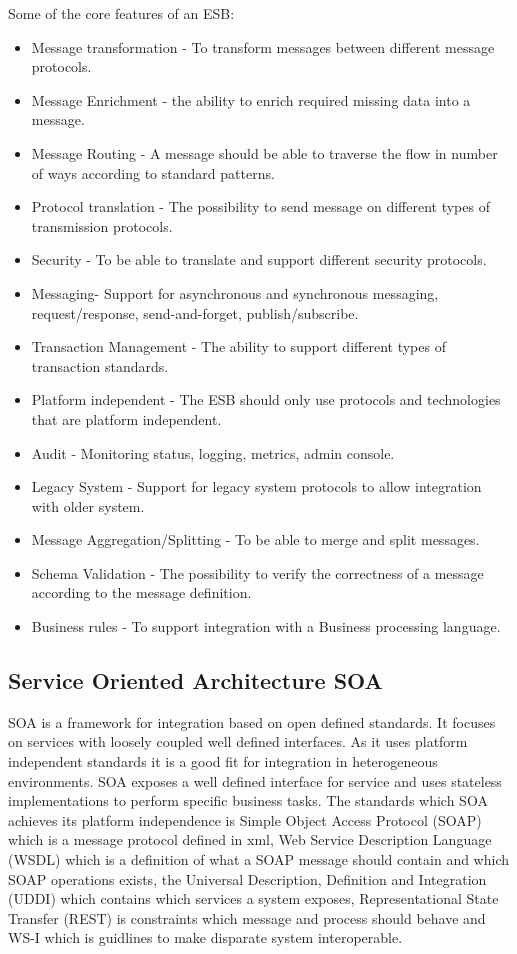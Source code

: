 \documentclass{llncs}
\begin{document}
Some of the core features of an ESB:
\begin{itemize}
\item Message transformation - To transform messages between different message protocols.
\item Message Enrichment - the ability to enrich required missing data into a message.
\item Message Routing - A message should be able to traverse the flow in number of ways according to standard patterns.
\item Protocol translation - The possibility to send message on different types of transmission protocols.
\item Security - To be able to translate and support different security protocols.
\item Messaging- Support for asynchronous and synchronous messaging, request/response, send-and-forget, publish/subscribe.
\item Transaction Management - The ability to support different types of transaction standards.
\item Platform independent - The ESB should only use protocols and technologies that are platform independent.
\item Audit - Monitoring status, logging, metrics, admin console.
\item Legacy System - Support for legacy system protocols to allow integration with older system.
\item Message Aggregation/Splitting - To be able to merge and split messages.
\item Schema Validation - The possibility to verify the correctness of a message according to the message definition.
\item Business rules - To support integration with a Business processing language.
\end{itemize}



\subsection{Service Oriented Architecture SOA}
SOA is a framework for integration based on open defined standards. It focuses on services with  loosely coupled well defined interfaces. As it uses platform independent standards it is a good fit for integration in heterogeneous environments. SOA exposes a well defined interface for service and uses stateless implementations to perform specific business tasks. The standards which SOA achieves its platform independence is Simple Object Access Protocol (SOAP) which is a message protocol defined in xml, Web Service Description Language (WSDL) which is a definition of what a SOAP message should contain and which SOAP operations exists, the Universal Description, Definition and Integration (UDDI) which contains which services a system exposes, Representational State Transfer (REST) is constraints which message and process should behave and WS-I which is guidlines to make disparate system interoperable.
\end{document}
